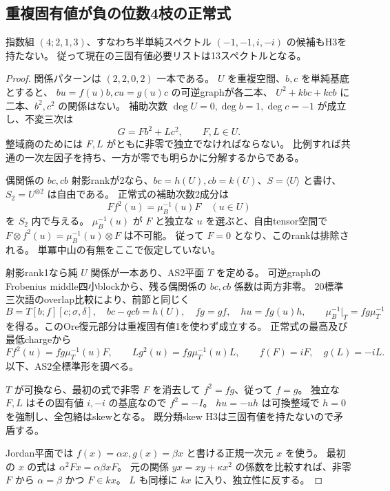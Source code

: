 \subsection{重複固有値が負の位数4枝の正常式}
\label{subsec:cubic-fourth-root-negative-repeat}
\begin{theorem}
\label{thm:cubic-fourth-root-negative-repeat-empty}
指数組 $(4;2,1,3)$、すなわち半単純スペクトル $(-1,-1,i,-i)$ の候補もH3を持たない。
従って現在の三固有値必要リストは13スペクトルとなる。
\end{theorem}
\begin{proof}
関係パターンは $(2,2,0,2)$ 一本である。
$U$ を重複空間、$b,c$ を単純基底とすると、
$bu=f(u)b,cu=g(u)c$ の可逆graphが各二本、
$U^2+kbc+kcb$ に二本、$b^2,c^2$ の関係はない。
補助次数 $\deg U=0,\deg b=1,\deg c=-1$ が成立し、不変三次は
\[
 G=F b^2+L c^2,\qquad F,L\in U.
\]
整域商のためには $F,L$ がともに非零で独立でなければならない。
比例すれば共通の一次左因子を持ち、一方が零でも明らかに分解するからである。

偶関係の $bc,cb$ 射影rankが2なら、$bc=h(U),cb=k(U)$、$S=\langle U\rangle$ と書け、
$S_2=U^{\otimes2}$ は自由である。
正常式の補助次数2成分は
\[
 F f^2(u)=\mu_B^{-1}(u)F\quad(u\in U)
\]
を $S_2$ 内で与える。
$\mu_B^{-1}(u)$ が $F$ と独立な $u$ を選ぶと、自由tensor空間で
$F\otimes f^2(u)=\mu_B^{-1}(u)\otimes F$ は不可能。
従って $F=0$ となり、このrankは排除される。
単冪中山の有無をここで仮定していない。

射影rank1なら純 $U$ 関係が一本あり、AS2平面 $T$ を定める。
可逆graphのFrobenius middle四小blockから、残る偶関係の $bc,cb$ 係数は両方非零。
20標準三次語のoverlap比較により、前節と同じく
\[
 B=T[b;f][c;\sigma,\delta],\quad bc-qcb=h(U),\quad
 fg=gf,\quad h u=fg(u)h,
 \qquad\mu_B^{-1}|_T=fg\mu_T^{-1}
\]
を得る。このOre復元部分は重複固有値1を使わず成立する。
正常式の最高及び最低chargeから
\[
 F f^2(u)=fg\mu_T^{-1}(u)F,\qquad
 L g^2(u)=fg\mu_T^{-1}(u)L,
 \qquad f(F)=iF,\quad g(L)=-iL.
\]
以下、AS2全標準形を調べる。

$T$ が可換なら、最初の式で非零 $F$ を消去して $f^2=fg$、従って $f=g$。
独立な $F,L$ はその固有値 $i,-i$ の基底なので $f^2=-I$。
$h u=-u h$ は可換整域で $h=0$ を強制し、全包絡はskewとなる。
既分類skew H3は三固有値を持たないので矛盾する。

Jordan平面では $f(x)=\alpha x,g(x)=\beta x$ と書ける正規一次元 $x$ を使う。
最初の $x$ の式は $\alpha^2 F x=\alpha\beta xF$。
元の関係 $yx=xy+\kappa x^2$ の係数を比較すれば、非零 $F$ から
$\alpha=\beta$ かつ $F\in kx$。
$L$ も同様に $kx$ に入り、独立性に反する。


\end{proof}
